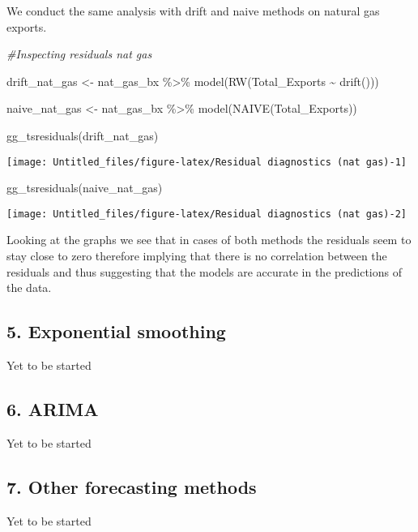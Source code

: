\documentclass[
]{article}
\newenvironment{Shaded}{\begin{snugshade}}{\end{snugshade}}
\newcommand{\CommentTok}[1]{\textcolor[rgb]{0.56,0.35,0.01}{\textit{#1}}}
\newcommand{\FunctionTok}[1]{\textcolor[rgb]{0.00,0.00,0.00}{#1}}
\newcommand{\NormalTok}[1]{#1}
\newcommand{\OtherTok}[1]{\textcolor[rgb]{0.56,0.35,0.01}{#1}}
\newcommand{\SpecialCharTok}[1]{\textcolor[rgb]{0.00,0.00,0.00}{#1}}
\begin{document}
We conduct the same analysis with drift and naive methods on natural gas
exports.

\begin{Shaded}
\begin{Highlighting}[]
\CommentTok{\#Inspecting residuals nat gas}

\NormalTok{drift\_nat\_gas }\OtherTok{\textless{}{-}}\NormalTok{ nat\_gas\_bx }\SpecialCharTok{\%\textgreater{}\%} 
  \FunctionTok{model}\NormalTok{(}\FunctionTok{RW}\NormalTok{(Total\_Exports }\SpecialCharTok{\textasciitilde{}} \FunctionTok{drift}\NormalTok{()))}

\NormalTok{naive\_nat\_gas }\OtherTok{\textless{}{-}}\NormalTok{ nat\_gas\_bx }\SpecialCharTok{\%\textgreater{}\%} 
  \FunctionTok{model}\NormalTok{(}\FunctionTok{NAIVE}\NormalTok{(Total\_Exports))}

\FunctionTok{gg\_tsresiduals}\NormalTok{(drift\_nat\_gas)}
\end{Highlighting}
\end{Shaded}

\begin{center}\texttt{[image: Untitled\_files/figure-latex/Residual diagnostics (nat gas)-1]} \end{center}

\begin{Shaded}
\begin{Highlighting}[]
\FunctionTok{gg\_tsresiduals}\NormalTok{(naive\_nat\_gas)}
\end{Highlighting}
\end{Shaded}

\begin{center}\texttt{[image: Untitled\_files/figure-latex/Residual diagnostics (nat gas)-2]} \end{center}

Looking at the graphs we see that in cases of both methods the residuals
seem to stay close to zero therefore implying that there is no
correlation between the residuals and thus suggesting that the models
are accurate in the predictions of the data.

\hypertarget{exponential-smoothing}{%
\subsection{5. Exponential smoothing}\label{exponential-smoothing}}

Yet to be started

\hypertarget{arima}{%
\subsection{6. ARIMA}\label{arima}}

Yet to be started

\hypertarget{other-forecasting-methods}{%
\subsection{7. Other forecasting
methods}\label{other-forecasting-methods}}

Yet to be started
\end{document}
